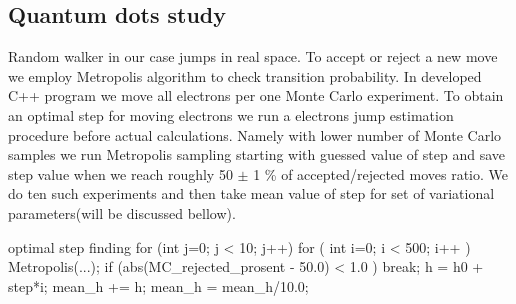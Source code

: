 \documentclass[10pt]{article}
\begin{document}
\subsection{Quantum dots study}
Random walker in our case jumps in real space. To accept or reject a new move we employ Metropolis algorithm to check transition probability.
In developed C++ program we move all electrons per one Monte Carlo experiment. To obtain an optimal step for moving electrons we run a electrons jump estimation procedure before actual calculations. Namely with lower number of Monte Carlo samples we run Metropolis sampling starting with guessed value of step and save step value when we reach roughly 50 $\pm $ 1 \% of accepted/rejected moves ratio. We do ten such experiments and then take mean value of step for set of variational parameters(will be discussed bellow).
\begin{pseudolisting}{optimal step finding}
for (int j=0; j < 10; j++) {
 for ( int i=0; i < 500; i++ ){
  Metropolis(...);
   if (abs(MC_rejected_prosent - 50.0) < 1.0 ){
    break;
   }
   h = h0 + step*i;
 }
 mean_h += h;
}
mean_h = mean_h/10.0;
\end{pseudolisting}
\end{document}
